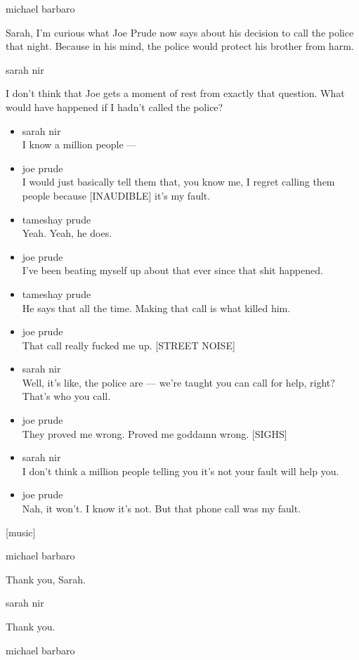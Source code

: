 michael barbaro

Sarah, I'm curious what Joe Prude now says about his decision to call
the police that night. Because in his mind, the police would protect his
brother from harm.

sarah nir

I don't think that Joe gets a moment of rest from exactly that question.
What would have happened if I hadn't called the police?

\begin{itemize}
\item
  sarah nir\\
  I know a million people ---
\item
  joe prude\\
  I would just basically tell them that, you know me, I regret calling
  them people because {[}INAUDIBLE{]} it's my fault.
\item
  tameshay prude\\
  Yeah. Yeah, he does.
\item
  joe prude\\
  I've been beating myself up about that ever since that shit happened.
\item
  tameshay prude\\
  He says that all the time. Making that call is what killed him.
\item
  joe prude\\
  That call really fucked me up. {[}STREET NOISE{]}
\item
  sarah nir\\
  Well, it's like, the police are --- we're taught you can call for
  help, right? That's who you call.
\item
  joe prude\\
  They proved me wrong. Proved me goddamn wrong. {[}SIGHS{]}
\item
  sarah nir\\
  I don't think a million people telling you it's not your fault will
  help you.
\item
  joe prude\\
  Nah, it won't. I know it's not. But that phone call was my fault.
\end{itemize}

{[}music{]}

michael barbaro

Thank you, Sarah.

sarah nir

Thank you.

michael barbaro

